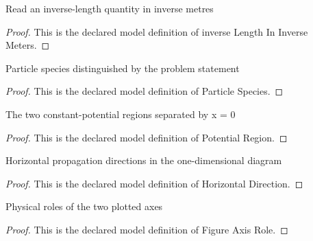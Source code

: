 \begin{definition}
  \label{def:physics:phyx-mini-0570:phyxminiproblems-problemphyxmini0570-inverselengthininversemeters}
  Read an inverse-length quantity in inverse metres
\end{definition}
\begin{proof}
  This is the declared model definition of inverse Length In Inverse Meters.
\end{proof}
\begin{definition}
  \label{def:physics:phyx-mini-0570:phyxminiproblems-problemphyxmini0570-particlespecies}
  Particle species distinguished by the problem statement
\end{definition}
\begin{proof}
  This is the declared model definition of Particle Species.
\end{proof}
\begin{definition}
  \label{def:physics:phyx-mini-0570:phyxminiproblems-problemphyxmini0570-potentialregion}
  The two constant-potential regions separated by x = 0
\end{definition}
\begin{proof}
  This is the declared model definition of Potential Region.
\end{proof}
\begin{definition}
  \label{def:physics:phyx-mini-0570:phyxminiproblems-problemphyxmini0570-horizontaldirection}
  Horizontal propagation directions in the one-dimensional diagram
\end{definition}
\begin{proof}
  This is the declared model definition of Horizontal Direction.
\end{proof}
\begin{definition}
  \label{def:physics:phyx-mini-0570:phyxminiproblems-problemphyxmini0570-figureaxisrole}
  Physical roles of the two plotted axes
\end{definition}
\begin{proof}
  This is the declared model definition of Figure Axis Role.
\end{proof}
